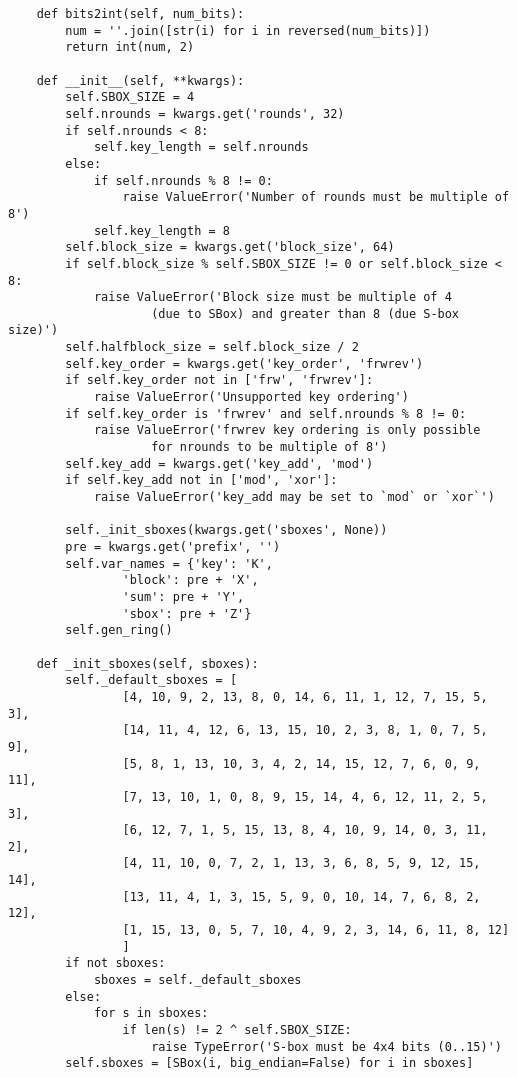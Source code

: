 \begin{appendices}
\begin{lstlisting}
    def bits2int(self, num_bits):
        num = ''.join([str(i) for i in reversed(num_bits)])
        return int(num, 2)

    def __init__(self, **kwargs):
        self.SBOX_SIZE = 4
        self.nrounds = kwargs.get('rounds', 32)
        if self.nrounds < 8:
            self.key_length = self.nrounds
        else:
            if self.nrounds % 8 != 0:
                raise ValueError('Number of rounds must be multiple of 8')
            self.key_length = 8
        self.block_size = kwargs.get('block_size', 64)
        if self.block_size % self.SBOX_SIZE != 0 or self.block_size < 8:
            raise ValueError('Block size must be multiple of 4 
                    (due to SBox) and greater than 8 (due S-box size)')
        self.halfblock_size = self.block_size / 2
        self.key_order = kwargs.get('key_order', 'frwrev')
        if self.key_order not in ['frw', 'frwrev']:
            raise ValueError('Unsupported key ordering')
        if self.key_order is 'frwrev' and self.nrounds % 8 != 0:
            raise ValueError('frwrev key ordering is only possible 
                    for nrounds to be multiple of 8')
        self.key_add = kwargs.get('key_add', 'mod')
        if self.key_add not in ['mod', 'xor']:
            raise ValueError('key_add may be set to `mod` or `xor`')

        self._init_sboxes(kwargs.get('sboxes', None))
        pre = kwargs.get('prefix', '')
        self.var_names = {'key': 'K', 
                'block': pre + 'X', 
                'sum': pre + 'Y',
                'sbox': pre + 'Z'}
        self.gen_ring()

    def _init_sboxes(self, sboxes):
        self._default_sboxes = [
                [4, 10, 9, 2, 13, 8, 0, 14, 6, 11, 1, 12, 7, 15, 5, 3],
                [14, 11, 4, 12, 6, 13, 15, 10, 2, 3, 8, 1, 0, 7, 5, 9],
                [5, 8, 1, 13, 10, 3, 4, 2, 14, 15, 12, 7, 6, 0, 9, 11],
                [7, 13, 10, 1, 0, 8, 9, 15, 14, 4, 6, 12, 11, 2, 5, 3],
                [6, 12, 7, 1, 5, 15, 13, 8, 4, 10, 9, 14, 0, 3, 11, 2],
                [4, 11, 10, 0, 7, 2, 1, 13, 3, 6, 8, 5, 9, 12, 15, 14],
                [13, 11, 4, 1, 3, 15, 5, 9, 0, 10, 14, 7, 6, 8, 2, 12],
                [1, 15, 13, 0, 5, 7, 10, 4, 9, 2, 3, 14, 6, 11, 8, 12]
                ]
        if not sboxes:
            sboxes = self._default_sboxes
        else:
            for s in sboxes:
                if len(s) != 2 ^ self.SBOX_SIZE: 
                    raise TypeError('S-box must be 4x4 bits (0..15)')
        self.sboxes = [SBox(i, big_endian=False) for i in sboxes]


\end{lstlisting}
\end{appendices}

